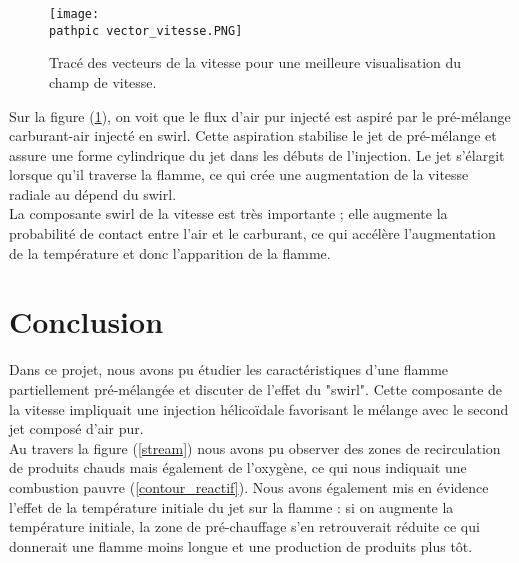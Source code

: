 \documentclass[a4paper,10pt]{article}
\newcommand\pathpic{/home/saura/Documents/Latex_files/Pic/BE_combustion/tp2/}
\begin{document}
\begin{figure}[ht!]
\centering
\texttt{[image: \\pathpic vector\_vitesse.PNG]}
\caption{Tracé des vecteurs de la vitesse pour une meilleure visualisation du champ de vitesse.}
\label{vitesse_vec}
\end{figure} 
\noindent Sur la figure (\ref{vitesse_vec}), on voit que le flux d'air pur injecté est aspiré par le pré-mélange carburant-air injecté en swirl. Cette aspiration stabilise le jet de pré-mélange et assure une forme cylindrique du jet dans les débuts de l'injection. Le jet s'élargit lorsque qu'il traverse la flamme, ce qui crée une augmentation de la vitesse radiale au dépend du swirl. \\
La composante swirl de la vitesse est très importante ; elle augmente la probabilité de contact entre l'air et le carburant, ce qui accélère l'augmentation de la température et donc l'apparition de la flamme. 

\section*{Conclusion}
\indent Dans ce projet, nous avons pu étudier les caractéristiques d'une flamme partiellement pré-mélangée et discuter de l'effet du "swirl". Cette composante de la vitesse impliquait une injection hélicoïdale favorisant le mélange avec le second jet composé d'air pur. \\
 Au travers la figure (\ref{stream}) nous avons pu observer des zones de recirculation de produits chauds mais également de l'oxygène, ce qui nous indiquait une combustion pauvre (\ref{contour_reactif}). Nous avons également mis en évidence l'effet de la température initiale du jet sur la flamme : si on augmente la température initiale, la zone de pré-chauffage s'en retrouverait réduite ce qui donnerait une flamme moins longue et une production de produits plus tôt.
\end{document}
